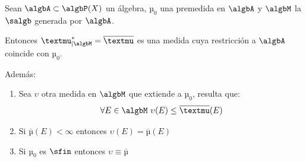 \documentclass{apuntes}
\begin{document}
\newpage
\begin{theorem}
Sean $\algbA \subset \algbP(X)$ un álgebra, $µ_0$ una premedida en $\algbA$ y $\algbM$ la $\salgb$ generada por $\algbA$.

Entonces $µ^*_{|\algbM}=\overline{µ}$ es una medida cuya restricción a $\algbA$ coincide con $µ_0$.

Además:
\begin{enumerate}
\item Sea $\upsilon$ otra medida en $\algbM$ que extiende a $µ_0$, resulta que:
\[\forall E \in \algbM \ \upsilon(E) \leq \overline{µ}(E)\]
\item Si $\overline{µ}(E) < \infty$ entonces $\upsilon(E) = \overline{µ}(E)$
\item Si $µ_0$ es $\sfin$ entonces $\upsilon \equiv \overline{µ}$
\end{enumerate}
\end{theorem}
\end{document}

